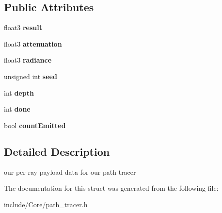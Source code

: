 \subsection*{Public Attributes}
\begin{DoxyCompactItemize}
\item 
\hypertarget{struct_per_ray_data__pathtrace_a8a319f8eb80736a85c0e066928beb022}{float3 {\bfseries result}}\label{struct_per_ray_data__pathtrace_a8a319f8eb80736a85c0e066928beb022}

\item 
\hypertarget{struct_per_ray_data__pathtrace_af35491c3f68e2c8813bcf05ebb9a388e}{float3 {\bfseries attenuation}}\label{struct_per_ray_data__pathtrace_af35491c3f68e2c8813bcf05ebb9a388e}

\item 
\hypertarget{struct_per_ray_data__pathtrace_ac0c890c6acb00164281a80517ae07bb7}{float3 {\bfseries radiance}}\label{struct_per_ray_data__pathtrace_ac0c890c6acb00164281a80517ae07bb7}

\item 
\hypertarget{struct_per_ray_data__pathtrace_a54e9b95a84815cc04d93085f627b4eb1}{unsigned int {\bfseries seed}}\label{struct_per_ray_data__pathtrace_a54e9b95a84815cc04d93085f627b4eb1}

\item 
\hypertarget{struct_per_ray_data__pathtrace_abf1d89e21751b675b4174de1f3075d1d}{int {\bfseries depth}}\label{struct_per_ray_data__pathtrace_abf1d89e21751b675b4174de1f3075d1d}

\item 
\hypertarget{struct_per_ray_data__pathtrace_ad45f4b682cacdd10af76a5f55b3a7eef}{int {\bfseries done}}\label{struct_per_ray_data__pathtrace_ad45f4b682cacdd10af76a5f55b3a7eef}

\item 
\hypertarget{struct_per_ray_data__pathtrace_a0d7601ec8f9a6b37d4a292df37c24d0a}{bool {\bfseries count\-Emitted}}\label{struct_per_ray_data__pathtrace_a0d7601ec8f9a6b37d4a292df37c24d0a}

\end{DoxyCompactItemize}


\subsection{Detailed Description}
our per ray payload data for our path tracer 

The documentation for this struct was generated from the following file\-:\begin{DoxyCompactItemize}
\item 
include/\-Core/path\-\_\-tracer.\-h\end{DoxyCompactItemize}
